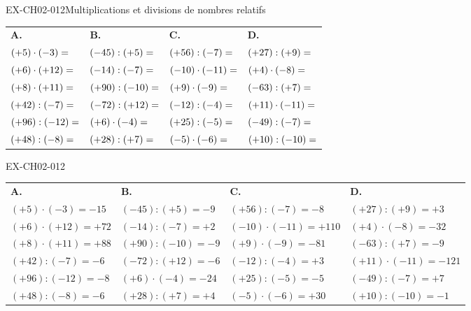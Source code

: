 \begin{exercice}{EX-CH02-012}{Multiplications et divisions de nombres relatifs}
{\small
\bigskip
\def\arraystretch{1.7}
\begin{tabularx}{\linewidth}{*{4}{X}}
\textbf{A.} & \textbf{B.} & \textbf{C.} & \textbf{D.} \\
$(+5)\cdot(-3)= \dotfill$    & $(-45):(+5)= \dotfill$  & $(+56):(-7)= \dotfill$      & $(+27):(+9)= \dotfill$      \\
$(+6)\cdot(+12)= \dotfill$   & $(-14):(-7)= \dotfill$  & $(-10)\cdot(-11)= \dotfill$ & $(+4)\cdot(-8)= \dotfill$   \\
$(+8)\cdot(+11)= \dotfill$   & $(+90):(-10)= \dotfill$ & $(+9)\cdot(-9)= \dotfill$   & $(-63):(+7)= \dotfill$      \\
$(+42):(-7)= \dotfill$       & $(-72):(+12)= \dotfill$ & $(-12):(-4)= \dotfill$      & $(+11)\cdot(-11)= \dotfill$ \\
$(+96):(-12)= \dotfill$      & $(+6)\cdot(-4)= \dotfill$ & $(+25):(-5)= \dotfill$    & $(-49):(-7)= \dotfill$      \\
$(+48):(-8)= \dotfill$       & $(+28):(+7)= \dotfill$  & $(-5)\cdot(-6)= \dotfill$   & $(+10):(-10)= \dotfill$     \\
\end{tabularx}
}
\end{exercice}

\begin{solution}{EX-CH02-012}

\def\arraystretch{1.7}
\begin{tabularx}{\linewidth}{*{4}{X}}
\textbf{A.} & \textbf{B.} & \textbf{C.} & \textbf{D.} \\
$(+5)\cdot(-3)=-15$    & $(-45):(+5)=-9$   & $(+56):(-7)=-8$       & $(+27):(+9)=+3$      \\
$(+6)\cdot(+12)=+72$   & $(-14):(-7)=+2$   & $(-10)\cdot(-11)=+110$& $(+4)\cdot(-8)=-32$  \\
$(+8)\cdot(+11)=+88$   & $(+90):(-10)=-9$  & $(+9)\cdot(-9)=-81$   & $(-63):(+7)=-9$      \\
$(+42):(-7)=-6$        & $(-72):(+12)=-6$  & $(-12):(-4)=+3$       & $(+11)\cdot(-11)=-121$\\
$(+96):(-12)=-8$       & $(+6)\cdot(-4)=-24$ & $(+25):(-5)=-5$     & $(-49):(-7)=+7$      \\
$(+48):(-8)=-6$        & $(+28):(+7)=+4$   & $(-5)\cdot(-6)=+30$   & $(+10):(-10)=-1$     \\
\end{tabularx}

\end{solution}